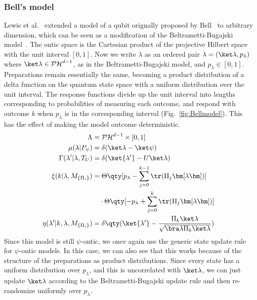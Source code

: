 \documentclass[%
 reprint,
superscriptaddress,
nofootinbib,
 amsmath,amssymb,
 prx, 
 accepted=2019-09-27,
]{quantumarticle}
\newcommand{\proj}[1]{{\bm[}#1{\bm]}}
\begin{document}
\subsubsection{Bell's model}
\label{sec:bells-model}
Lewis et al.~\cite{LewisDistinctQuantumStates2012} extended a model of
a qubit orignally proposed by
Bell~\cite{BellProblemHiddenVariables1966} to arbitrary dimension,
which can be seen as a modification of the Beltrametti-Bugajski
model~\cite{Leiferquantumstatereal2014}. The ontic space is the
Cartesian product of the projective Hilbert space with the unit
interval $[0,1]$. Now we write $\lambda$ as an ordered pair
$\lambda= (\ket\lambda,p_\lambda)$ where
$\ket\lambda\in\mathcal{PH}^{d-1}$, as in the Beltrametti-Bugajski
model, and $p_\lambda\in[0,1]$. Preparations remain essentially the
same, becoming a product distribution of a delta function on the
quantum state space with a uniform distribution over the unit
interval. The response functions divide up the unit interval into
lengths corresponding to probabilities of measuring each outcome, and
respond with outcome $k$ when $p_\lambda$ is in the corresponding
interval (Fig.~\ref{fig:Bellmodel}). This has the effect of making the
model outcome deterministic.
\begin{align}
  \Lambda&= \mathcal{PH}^{d-1}\times[0,1]\nonumber\\
  \mu(\lambda|P_\psi) &= \delta(\ket\lambda-\ket\psi)\nonumber\\
  \Gamma(\lambda'|\lambda,T_U)
         &= \delta(\ket{\lambda'}-U\ket\lambda)\nonumber\\
  \xi(k|\lambda,M_{\{\Pi_i\}})&= \Theta\qty[p_\lambda-\sum_{j=0}^{k-1}\tr(\Pi_j\proj\lambda)]\nonumber\\
         &\quad\cdot\Theta\qty[-p_\lambda+\sum_{j=0}^{k}\tr(\Pi_j\proj\lambda)]\nonumber\\
  \eta(\lambda'|k,\lambda,M_{\{\Pi_i\}})
         &= \delta\qty(\ket{\lambda'}-\frac{\Pi_k\ket\lambda}
           {\sqrt{\bra\lambda \Pi_k\ket\lambda}})
\end{align}
Since this model is still $\psi$-ontic, we once again use the generic
state update rule for $\psi$-ontic models. In this case, we can also
see that this works because of the structure of the preparations as
product distributions. Since every state has a uniform distribution
over $p_\lambda$, and this is uncorrelated with $\ket\lambda$, we can
just update $\ket\lambda$ according to the Beltrametti-Bugajski update
rule and then re-randomize uniformly over $p_\lambda$.
\end{document}
